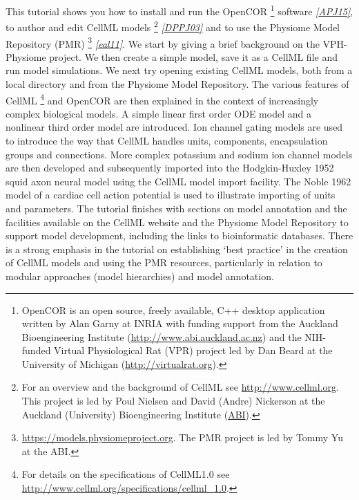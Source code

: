 \documentclass[a4paper,10pt,english]{sphinxmanual}
\begin{document}
This tutorial shows you how to install and run the OpenCOR \footnote[1]{
OpenCOR is an open source, freely available, C++ desktop application written by Alan Garny at INRIA with funding support from the Auckland Bioengineering Institute (\href{http://www.abi.auckland.ac.nz}{http://www.abi.auckland.ac.nz}) and the NIH-funded Virtual Physiological Rat (VPR) project led by Dan Beard at the University of Michigan (\href{http://virtualrat.org}{http://virtualrat.org}).
} software
\label{index:id2}{\hyperref[zreferences:id1]{\emph{{[}APJ15{]}}}}, to author and edit CellML models \footnote[2]{
For an overview and the background of CellML see \href{http://www.cellml.org}{http://www.cellml.org}. This project is led by Poul Nielsen and David (Andre) Nickerson at the Auckland (University) Bioengineering Institute (\href{http://www.abi.auckland.ac.nz}{ABI}).
} \label{index:id4}{\hyperref[zreferences:id7]{\emph{{[}DPPJ03{]}}}} and to use the Physiome
Model Repository (PMR) \footnote[3]{
\href{https://models.physiomeproject.org}{https://models.physiomeproject.org}. The PMR project is led by Tommy Yu at the ABI.
} \label{index:id6}{\hyperref[zreferences:id9]{\emph{{[}eal11{]}}}}. We start by giving a brief background
on the VPH-Physiome project. We then create a simple model, save it as a
CellML file and run model simulations. We next try opening existing
CellML models, both from a local directory and from the Physiome Model
Repository. The various features of CellML \footnote[4]{
For details on the specifications of CellML1.0 see \href{http://www.cellml.org/specifications/cellml\_1.0}{http://www.cellml.org/specifications/cellml\_1.0}.
} and OpenCOR are then
explained in the context of increasingly complex biological models. A
simple linear first order ODE model and a nonlinear third order model
are introduced. Ion channel gating models are used to introduce the way
that CellML handles units, components, encapsulation groups and
connections. More complex potassium and sodium ion channel models are
then developed and subsequently imported into the Hodgkin-Huxley 1952
squid axon neural model using the CellML model import facility. The
Noble 1962 model of a cardiac cell action potential is used to
illustrate importing of units and parameters. The tutorial finishes with
sections on model annotation and the facilities available on the CellML
website and the Physiome Model Repository to support model development,
including the links to bioinformatic databases. There is a strong
emphasis in the tutorial on establishing ‘best practice’ in the creation
of CellML models and using the PMR resources, particularly in relation
to modular approaches (model hierarchies) and model annotation.
\end{document}
